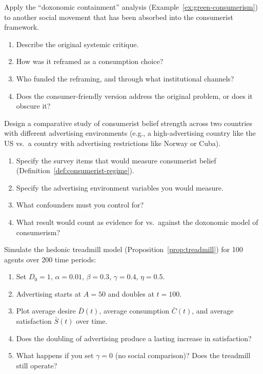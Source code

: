 \begin{exercise}
Apply the ``doxonomic containment'' analysis (Example~\ref{ex:green-consumerism}) to another social movement that has been absorbed into the consumerist framework.
\begin{enumerate}[nosep]
  \item Describe the original systemic critique.
  \item How was it reframed as a consumption choice?
  \item Who funded the reframing, and through what institutional channels?
  \item Does the consumer-friendly version address the original problem, or does it obscure it?
\end{enumerate}
\end{exercise}

\begin{exercise}
Design a comparative study of consumerist belief strength across two countries with different advertising environments (e.g., a high-advertising country like the US vs.\ a country with advertising restrictions like Norway or Cuba).
\begin{enumerate}[nosep]
  \item Specify the survey items that would measure consumerist belief (Definition~\ref{def:consumerist-regime}).
  \item Specify the advertising environment variables you would measure.
  \item What confounders must you control for?
  \item What result would count as evidence for vs.\ against the doxonomic model of consumerism?
\end{enumerate}
\end{exercise}

\begin{exercise}[Computational]
Simulate the hedonic treadmill model (Proposition~\ref{prop:treadmill}) for 100 agents over 200 time periods:
\begin{enumerate}[nosep]
  \item Set $D_0 = 1$, $\alpha = 0.01$, $\beta = 0.3$, $\gamma = 0.4$, $\eta = 0.5$.
  \item Advertising starts at $A = 50$ and doubles at $t = 100$.
  \item Plot average desire $\bar{D}(t)$, average consumption $\bar{C}(t)$, and average satisfaction $\bar{S}(t)$ over time.
  \item Does the doubling of advertising produce a lasting increase in satisfaction?
  \item What happens if you set $\gamma = 0$ (no social comparison)? Does the treadmill still operate?
\end{enumerate}
\end{exercise}

